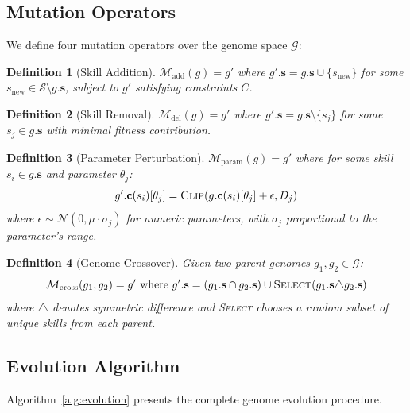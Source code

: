 \documentclass{article}
\newtheorem{definition}{Definition}
\newcommand{\genomespace}{\mathcal{G}}
\newcommand{\skillset}{\mathcal{S}}
\newcommand{\mutation}{\mathcal{M}}
\begin{document}
\subsection{Mutation Operators}

We define four mutation operators over the genome space $\genomespace$:

\begin{definition}[Skill Addition]
$\mutation_{\text{add}}(g) = g'$ where $g'.\mathbf{s} = g.\mathbf{s} \cup \{s_{\text{new}}\}$ for some $s_{\text{new}} \in \skillset \setminus g.\mathbf{s}$, subject to $g'$ satisfying constraints $C$.
\end{definition}

\begin{definition}[Skill Removal]
$\mutation_{\text{del}}(g) = g'$ where $g'.\mathbf{s} = g.\mathbf{s} \setminus \{s_j\}$ for some $s_j \in g.\mathbf{s}$ with minimal fitness contribution.
\end{definition}

\begin{definition}[Parameter Perturbation]
$\mutation_{\text{param}}(g) = g'$ where for some skill $s_i \in g.\mathbf{s}$ and parameter $\theta_j$:
\begin{equation}
    g'.\mathbf{c}(s_i)[\theta_j] = \textsc{Clip}(g.\mathbf{c}(s_i)[\theta_j] + \epsilon, D_j)
\end{equation}
where $\epsilon \sim \mathcal{N}(0, \mu \cdot \sigma_j)$ for numeric parameters, with $\sigma_j$ proportional to the parameter's range.
\end{definition}

\begin{definition}[Genome Crossover]
Given two parent genomes $g_1, g_2 \in \genomespace$:
\begin{equation}
    \mutation_{\text{cross}}(g_1, g_2) = g' \text{ where } g'.\mathbf{s} = (g_1.\mathbf{s} \cap g_2.\mathbf{s}) \cup \textsc{Select}(g_1.\mathbf{s} \triangle g_2.\mathbf{s})
\end{equation}
where $\triangle$ denotes symmetric difference and \textsc{Select} chooses a random subset of unique skills from each parent.
\end{definition}


\subsection{Evolution Algorithm}

Algorithm~\ref{alg:evolution} presents the complete genome evolution procedure.
\end{document}
